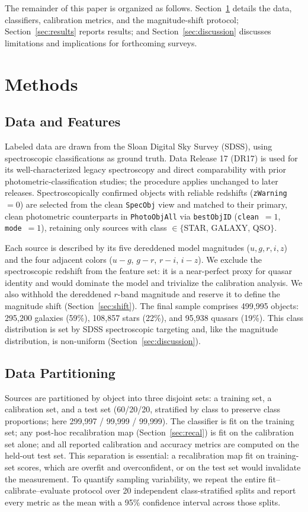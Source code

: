 \documentclass[conference]{IEEEtran}
\begin{document}
The remainder of this paper is organized as follows. Section~\ref{sec:methods} details the data, classifiers, calibration metrics, and the magnitude-shift protocol; Section~\ref{sec:results} reports results; and Section~\ref{sec:discussion} discusses limitations and implications for forthcoming surveys.

\section{Methods}\label{sec:methods}

\subsection{Data and Features}
Labeled data are drawn from the Sloan Digital Sky Survey (SDSS), using spectroscopic classifications as ground truth. Data Release 17 (DR17) is used for its well-characterized legacy spectroscopy and direct comparability with prior photometric-classification studies; the procedure applies unchanged to later releases. Spectroscopically confirmed objects with reliable redshifts (\texttt{zWarning}~$=0$) are selected from the clean \texttt{SpecObj} view and matched to their primary, clean photometric counterparts in \texttt{PhotoObjAll} via \texttt{bestObjID} (\texttt{clean}~$=1$, \texttt{mode}~$=1$), retaining only sources with class $\in \{$STAR, GALAXY, QSO$\}$.

Each source is described by its five dereddened model magnitudes ($u, g, r, i, z$) and the four adjacent colors ($u-g$, $g-r$, $r-i$, $i-z$). We exclude the spectroscopic redshift from the feature set: it is a near-perfect proxy for quasar identity and would dominate the model and trivialize the calibration analysis. We also withhold the dereddened $r$-band magnitude and reserve it to define the magnitude shift (Section~\ref{sec:shift}). The final sample comprises 499{,}995 objects: 295{,}200 galaxies (59\%), 108{,}857 stars (22\%), and 95{,}938 quasars (19\%). This class distribution is set by SDSS spectroscopic targeting and, like the magnitude distribution, is non-uniform (Section~\ref{sec:discussion}).

\subsection{Data Partitioning}
Sources are partitioned by object into three disjoint sets: a training set, a calibration set, and a test set (60/20/20, stratified by class to preserve class proportions; here 299{,}997 / 99{,}999 / 99{,}999). The classifier is fit on the training set; any post-hoc recalibration map (Section~\ref{sec:recal}) is fit on the calibration set alone; and all reported calibration and accuracy metrics are computed on the held-out test set. This separation is essential: a recalibration map fit on training-set scores, which are overfit and overconfident, or on the test set would invalidate the measurement. To quantify sampling variability, we repeat the entire fit--calibrate--evaluate protocol over 20 independent class-stratified splits and report every metric as the mean with a 95\% confidence interval across those splits.
\end{document}
